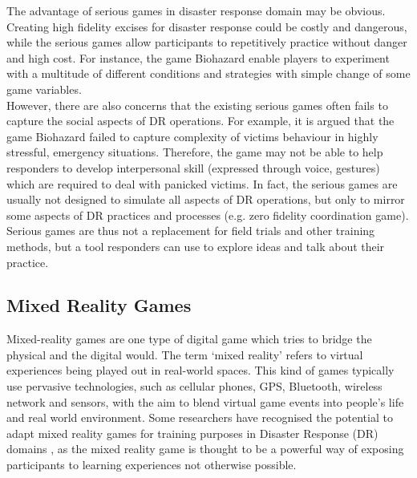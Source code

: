 The advantage of serious games in disaster response domain may be obvious. Creating high fidelity excises for disaster response could be costly and dangerous, while the serious games allow participants to repetitively practice without danger and high cost. For instance, the game Biohazard\cite{Susi2007} enable players to experiment with a multitude of different conditions and strategies with simple change of some game variables.\\

However, there are also concerns that the existing serious games often fails to capture the social aspects of DR operations. For example, it is argued that the game Biohazard failed to capture complexity of victims behaviour in highly stressful, emergency situations. Therefore, the game may not be able to help responders to develop interpersonal skill (expressed through voice, gestures) which are required to deal with panicked victims\cite{Susi2007}. In fact, the serious games are usually not designed to simulate all aspects of DR operations, but only to mirror some aspects of DR practices and processes (e.g. zero fidelity coordination game). Serious games are thus not a replacement for field trials and other training methods, but a tool responders can use to explore ideas and talk about their practice.\\


\subsection{Mixed Reality Games}
Mixed-reality games are one type of digital game which tries to bridge the physical and the digital \cite{Benford2005} would. The term `mixed reality' refers to virtual experiences being played out in real-world spaces. This kind of games typically use pervasive technologies, such as cellular phones, GPS, Bluetooth, wireless network and sensors, with the aim to blend virtual game events into people's life and real world environment. Some researchers have recognised the potential to adapt mixed reality games for training purposes in Disaster Response (DR) domains \cite{Fischer2012}, as the mixed reality game is thought to be a powerful way of exposing participants to learning experiences not otherwise possible. \\

